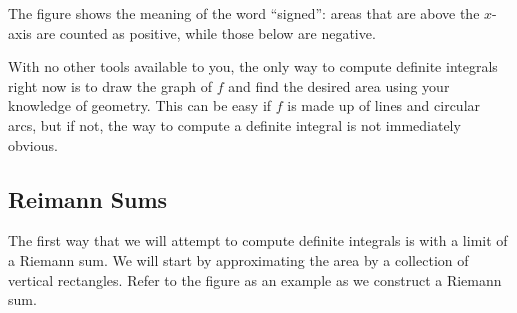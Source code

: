 The figure shows the meaning of the word ``signed'': areas that are above the $x$-axis are counted as positive, while those below are negative.

With no other tools available to you, the only way to compute definite integrals right now is to draw the graph of $f$ and find the desired area using your knowledge of geometry.  This can be easy if $f$ is made up of lines and circular arcs, but if not, the way to compute a definite integral is not immediately obvious.

\subsection{Reimann Sums}

The first way that we will attempt to compute definite integrals is with a limit of a Riemann sum. We will start by approximating the area by a collection of vertical rectangles. Refer to the figure as an example as we construct a Riemann sum.

